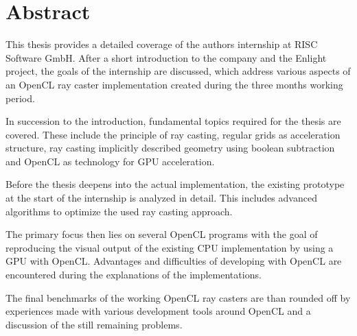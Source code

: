 \section*{Abstract}

This thesis provides a detailed coverage of the authors internship at RISC Software GmbH. After a short introduction to the company and the Enlight project, the goals of the internship are discussed, which address various aspects of an OpenCL ray caster implementation created during the three months working period.

In succession to the introduction, fundamental topics required for the thesis are covered. These include the principle of ray casting, regular grids as acceleration structure, ray casting implicitly described geometry using boolean subtraction and OpenCL as technology for GPU acceleration.

Before the thesis deepens into the actual implementation, the existing prototype at the start of the internship is analyzed in detail. This includes advanced algorithms to optimize the used ray casting approach.

The primary focus then lies on several OpenCL programs with the goal of reproducing the visual output of the existing CPU implementation by using a GPU with OpenCL. Advantages and difficulties of developing with OpenCL are encountered during the explanations of the implementations.

The final benchmarks of the working OpenCL ray casters are than rounded off by experiences made with various development tools around OpenCL and a discussion of the still remaining problems.
